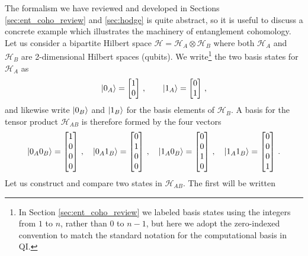 \documentclass[12pt]{article}
\numberwithin{equation}{section}
\begin{document}
The formalism we have reviewed and developed in Sections \ref{sec:ent_coho_review} and \ref{sec:hodge} is quite abstract, so it is useful to discuss a concrete example which illustrates the machinery of entanglement cohomology. Let us consider a bipartite Hilbert space $\mathcal{H} = \mathcal{H}_A \otimes \mathcal{H}_B$ where both $\mathcal{H}_A$ and $\mathcal{H}_B$ are 2-dimensional Hilbert spaces (qubits). We write\footnote{In Section \ref{sec:ent_coho_review} we labeled basis states using the integers from $1$ to $n$, rather than $0$ to $n - 1$, but here we adopt the zero-indexed convention to match the standard notation for the computational basis in QI.} the two basis states for $\mathcal{H}_A$ as
%
\begin{align}
    \ket{0_A} = \begin{bmatrix} 1 \\ 0 \end{bmatrix} \, , \qquad \ket{1_A} = \begin{bmatrix} 0 \\ 1 \end{bmatrix} \, , 
\end{align}
%
and likewise write $\ket{0_B}$ and $\ket{1_B}$ for the basis elements of $\mathcal{H}_B$. A basis for the tensor product $\mathcal{H}_{AB}$ is therefore formed by the four vectors
%
\begin{align}
    \ket{0_A 0_B} = \begin{bmatrix} 1 \\ 0 \\ 0 \\ 0 \end{bmatrix} \, , \quad \ket{0_A 1_B} = \begin{bmatrix} 0 \\ 1 \\ 0 \\ 0 \end{bmatrix} \, , \quad \ket{1_A 0_B} = \begin{bmatrix} 0 \\ 0 \\ 1 \\ 0 \end{bmatrix} \, , \quad \ket{1_A 1_B} = \begin{bmatrix} 0 \\ 0 \\ 0 \\ 1 \end{bmatrix} \, .
\end{align}
%
Let us construct and compare two states in $\mathcal{H}_{AB}$. The first will be written
\end{document}
